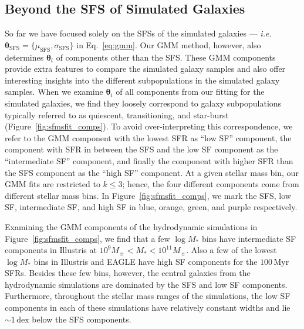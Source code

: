 \documentclass[tighten, preprint]{aastex62}
\begin{document}
\subsection{Beyond the SFS of Simulated Galaxies} \label{sec:beyondsfms}
So far we have focused solely on the SFSs of the simulated galaxies --- \emph{i.e.} 
$\bm{\theta}_\mathrm{SFS} = \{\mu_\mathrm{SFS}, \sigma_\mathrm{SFS} \}$ 
in Eq.~\ref{eq:gmm}. Our GMM method, however, also determines 
$\bm{\theta}_i$ of components other than the SFS. These GMM components 
provide extra features to compare the simulated galaxy samples and also 
offer interesting insights into the different subpopulations in the simulated 
galaxy samples. When we examine $\bm{\theta}_i$ of all components from 
our fitting for the simulated galaxies, we find they loosely correspond 
to galaxy subpopulations typically referred to as quiescent, transitioning, 
and star-burst (Figure~\ref{fig:sfmsfit_comps}). To avoid over-interpreting 
this correspondence, we refer to the GMM component with the lowest SFR as 
``low SF'' component, the component with SFR in between the SFS and the 
low SF component as the ``intermediate SF'' component, and finally the 
component with higher SFR than the SFS component as the ``high SF'' component. 
At a given stellar mass bin, our GMM fits are restricted to $k\leq3$; hence, 
the four different components come from different stellar mass bins. 
In Figure~\ref{fig:sfmsfit_comps}, we mark the SFS, low SF, intermediate SF, 
and high SF in blue, orange, green, and purple respectively.

Examining the GMM components of the hydrodynamic simulations in 
Figure~\ref{fig:sfmsfit_comps}, we find that a few $\log M_*$ bins have 
intermediate SF components in Illustris at $10^9 M_\sun < M_* < 10^{11}M_\sun$.
Also a few of the lowest $\log M_*$ bins in Illustris and EAGLE have high SF
components for the $100\,\mathrm{Myr}$ SFRs. Besides these few 
bins, however, the central galaxies from the hydrodynamic simulations are
dominated by the SFS and low SF components. Furthermore, 
throughout the stellar mass ranges of the simulations, the low SF 
components in each of these simulations have relatively constant widths and 
lie ${\sim}1\,\mathrm{dex}$ below the SFS components.
\end{document}
